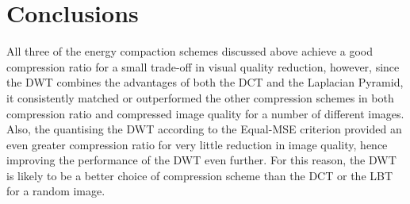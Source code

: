 \documentclass{article}					%
\begin{document}
\section{Conclusions}
All three of the energy compaction schemes discussed above achieve a good compression ratio for a small trade-off in visual quality reduction, however, since the DWT combines the advantages of both the DCT and the Laplacian Pyramid, it consistently matched or outperformed the other compression schemes in both compression ratio and compressed image quality for a number of different images. Also, the quantising the DWT according to the Equal-MSE criterion provided an even greater compression ratio for very little reduction in image quality, hence improving the performance of the DWT even further. For this reason, the DWT is likely to be a better choice of compression scheme than the DCT or the LBT for a random image.
\newpage
\end{document}
